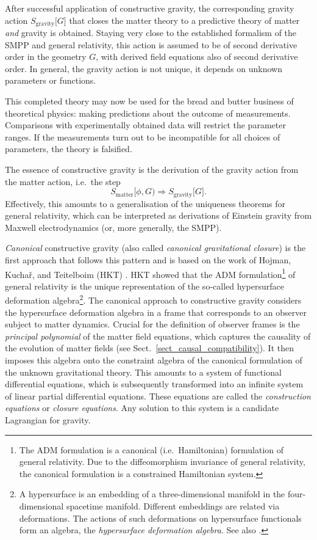After successful application of constructive gravity, the corresponding gravity action $S_\text{gravity}\lbrack G\rbrack$ that closes the matter theory to a predictive theory of matter \emph{and} gravity is obtained. Staying very close to the established formalism of the SMPP and general relativity, this action is assumed to be of second derivative order in the geometry $G$, with derived field equations also of second derivative order. In general, the gravity action is not unique, it depends on unknown parameters or functions.

This completed theory may now be used for the bread and butter business of theoretical physics: making predictions about the outcome of measurements. Comparisons with experimentally obtained data will restrict the parameter ranges. If the measurements turn out to be incompatible for all choices of parameters, the theory is falsified.

The essence of constructive gravity is the derivation of the gravity action from the matter action, i.e.\ the step
\begin{equation*}
  S_\text{matter}\lbrack\phi,G) \Rightarrow S_\text{gravity}\lbrack G\rbrack.
\end{equation*}
Effectively, this amounts to a generalisation of the uniqueness theorems for general relativity, which can be interpreted as derivations of Einstein gravity from Maxwell electrodynamics (or, more generally, the SMPP).

\emph{Canonical} constructive gravity (also called \emph{canonical gravitational closure}) \cite{Giesel_2012,Schuller_2014,Witte_2014,D_ll_2018} is the first approach that follows this pattern and is based on the work of Hojman, Kucha\v{r}, and Teitelboim (HKT) \cite{Hojman_1976}. HKT showed that the ADM formulation\footnote{The ADM formulation \cite{Arnowitt_1960} is a canonical (i.e.\ Hamiltonian) formulation of general relativity. Due to the diffeomorphism invariance of general relativity, the canonical formulation is a constrained Hamiltonian system.} of general relativity is the unique representation of the so-called hypersurface deformation algebra\footnote{A hypersurface is an embedding of a three-dimensional manifold in the four-dimensional spacetime manifold. Different embeddings are related via deformations. The actions of such deformations on hypersurface functionals form an algebra, the \emph{hypersurface deformation algebra}. See also \cite{Hojman_1976}.}. The canonical approach to constructive gravity considers the hypersurface deformation algebra in a frame that corresponds to an observer subject to matter dynamics. Crucial for the definition of observer frames is the \emph{principal polynomial} of the matter field equations, which captures the causality of the evolution of matter fields (see Sect.~\ref{sect_causal_compatibility}). It then imposes this algebra onto the constraint algebra of the canonical formulation of the unknown gravitational theory. This amounts to a system of functional differential equations, which is subsequently transformed into an infinite system of linear partial differential equations. These equations are called the \emph{construction equations} or \emph{closure equations}. Any solution to this system is a candidate Lagrangian for gravity.

